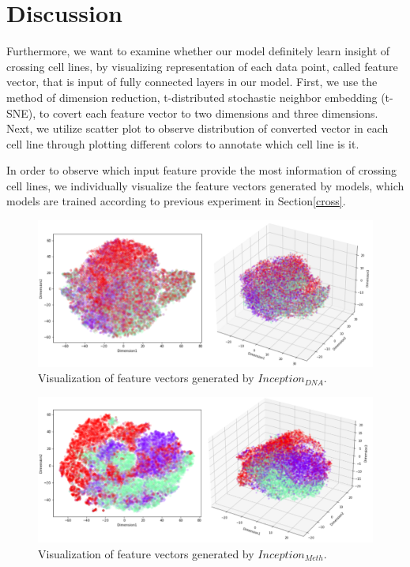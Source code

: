 \section{Discussion} \label{discuss}
Furthermore, we want to examine whether our model definitely learn insight of crossing cell lines, by visualizing representation of each data point, called feature vector, that is input of fully connected layers in our model. First, we use the method of dimension reduction, t-distributed stochastic neighbor embedding (t-SNE), to covert each feature vector to two dimensions and three dimensions. Next, we utilize scatter plot to observe distribution of converted vector in each cell line through plotting different colors to annotate which cell line is it.

In order to observe which input feature provide the most information of crossing cell lines, we individually visualize the feature vectors generated by models, which models are trained according to previous experiment in Section\ref{cross}.

\begin{figure}[H]
    \centering
    \includegraphics[width=1\columnwidth]{body/figure/figure17.png}
    \captionsetup{labelfont=bf}
    \renewcommand{\baselinestretch}{1.0}
    \caption[Visualization of feature vectors generated by $Inception_{DNA}$]{Visualization of feature vectors generated by $Inception_{DNA}$.}
    \label{f17}
\end{figure}

\begin{figure}[H]
    \centering
    \includegraphics[width=1\columnwidth]{body/figure/figure18.png}
    \captionsetup{labelfont=bf}
    \renewcommand{\baselinestretch}{1.0}
    \caption[Visualization of feature vectors generated by $Inception_{Meth}$]{Visualization of feature vectors generated by $Inception_{Meth}$.}
    \label{f18}
\end{figure}

